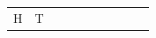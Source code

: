 {\begin{tabular}[t]{|l|l|l|l|l|l|l|l|l|l|}
        H &
        T%
     \tabularnewline\cline{1-1}\cline{2-2}\cline{3-3}\cline{4-4}\cline{5-5}\cline{6-6}\cline{7-7}\cline{8-8}\cline{9-9}\cline{10-10}
    \end{tabular}} %
